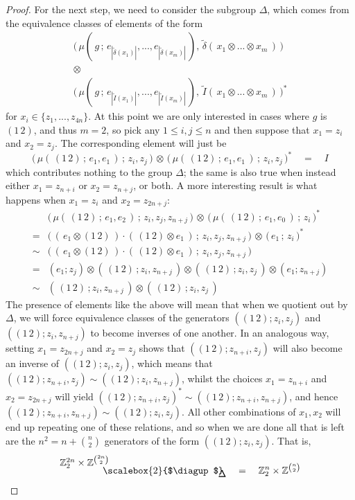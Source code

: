 \documentclass{amsbook} %
\newcommand{\bigquotient}[2]{ \raisebox{0.75\height}{$#1$} \mkern-12mu\scalebox{2}{$\diagup$}\mkern-10mu \raisebox{-0.5\height}{$#2$} }
\numberwithin{section}{chapter}
\begin{document}
\begin{proof}
For the next step, we need to consider the subgroup $\Delta$, which comes from the equivalence classes of elements of the form
\[ \begin{array}{c}
				\big( \, \mu( \, g \, ; \, e_{|\tilde{\delta}(x_1)|}, ..., e_{|\tilde{\delta}(x_m)|} \, ), \, \tilde{\delta}( \, x_1 \otimes ... \otimes x_m \, ) \, \big) \\
				\otimes \\
				\big( \, \mu( \, g \, ; \, e_{|\tilde{I}(x_1)|}, ..., e_{|\tilde{I}(x_m)|} \, ), \, \tilde{I}( \, x_1 \otimes ... \otimes x_m \, ) \, \big)^*
		\end{array} 
\]
for $x_i \in \{z_1, ..., z_{4n} \}$. At this point we are only interested in cases where $g$ is $(1 \, 2)$, and thus $m=2$, so pick any $1 \le i,j \le n$ and then suppose that $x_1 = z_i$ and $x_2 = z_j$. The corresponding element will just be
\[ \big( \, \mu( \, (1 \, 2) \, ; \, e_1, e_1 \, ) \, ; \, z_i, z_j \, \big) \, \otimes \, \big( \, \mu( \, (1 \, 2) \, ; \, e_1, e_1 \, ) \, ; \, z_i, z_j \, \big)^* \quad = \quad I \]
which contributes nothing to the group $\Delta$; the same is also true when instead either $x_1 = z_{n+i}$ or $x_2 = z_{n+j}$, or both. A more interesting result is what happens when $x_1 = z_i$ and $x_2 = z_{2n+j}$: 
\[ \begin{array}{rl}
			& \big( \, \mu( \, (1 \, 2) \, ; \, e_1, e_2 \, ) \, ; \, z_i , z_j, z_{n+j} \, \big) \, \otimes \, \big( \,  \mu( \, (1 \, 2) \, ; \, e_1, e_0 \, ) \, ; \, z_i \, \big)^* \\
			= & \big( \, ( \, e_1 \otimes (1 \, 2) \, ) \cdot ( \, (1 \, 2) \otimes e_1 \,) \, ; \, z_i , z_j, z_{n+j} \, \big) \, \otimes \, \big( \, e_1 \, ; \, z_i \, \big)^* \\
			\sim & \big( \, ( \, e_1 \otimes (1 \, 2) \, ) \cdot ( \, (1 \, 2) \otimes e_1 \,) \, ; \, z_i , z_j, z_{n+j} \, \big) \\
			= &  (e_1 ; z_j) \otimes ( \, (1 \, 2) \, ;  z_i, z_{n+j} \, ) \otimes ( \, (1 \, 2) \, ;  z_i , z_{j} \, ) \otimes (e_1 ;z_{n+j}) \\
			\sim & ( \, (1 \, 2) \, ;  z_i, z_{n+j} \, ) \otimes ( \, (1 \, 2) \, ;  z_i , z_j \, )
		\end{array}
\]
The presence of elements like the above will mean that when we quotient out by $\Delta$, we will force equivalence classes of the generators $((1 \, 2);  z_i , z_j )$ and $((1 \, 2) ; z_i, z_{n+j})$ to become inverses of one another. In an analogous way, setting $x_1 = z_{2n+j}$ and $x_2 = z_j$ shows that $((1 \, 2) ; z_{n+i}, z_j)$ will also become an inverse of $((1 \, 2); z_i , z_j)$, which means that $((1 \, 2) ; z_{n+i}, z_j) \sim ((1 \, 2) ; z_i, z_{n+j})$, whilst the choices $x_1 = z_{n+i}$ and $x_2 = z_{2n+j}$ will yield $((1 \, 2) ; z_{n+i}, z_j)^* \sim ((1 \, 2) ; z_{n+i}, z_{n+j})$, and hence $((1 \, 2) ; z_{n+i}, z_{n+j}) \sim ((1 \, 2) ; z_i, z_j)$. All other combinations of $x_1, x_2$ will end up repeating one of these relations, and so when we are done all that is left are the $n^2 = n + {{n}\choose{2}}$ generators of the form $((1 \, 2) ; z_i, z_j)$. That is,
\[ \bigquotient{\mathbb{Z}_2^{2n} \times \mathbb{Z}^{{2n}\choose{2}}}{\Delta} \quad = \quad \mathbb{Z}_2^{n} \times \mathbb{Z}^{{n}\choose{2}} \]


\end{proof}
\end{document}
